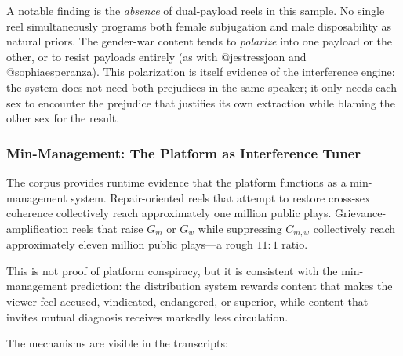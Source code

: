 \documentclass[12pt]{article}
\begin{document}
A notable finding is the \textit{absence} of dual-payload reels in this sample. No single reel simultaneously programs both female subjugation and male disposability as natural priors. The gender-war content tends to \textit{polarize} into one payload or the other, or to resist payloads entirely (as with @jestressjoan and @sophiaesperanza). This polarization is itself evidence of the interference engine: the system does not need both prejudices in the same speaker; it only needs each sex to encounter the prejudice that justifies its own extraction while blaming the other sex for the result.

\subsubsection{Min-Management: The Platform as Interference Tuner}

The corpus provides runtime evidence that the platform functions as a min-management system. Repair-oriented reels that attempt to restore cross-sex coherence collectively reach approximately one million public plays. Grievance-amplification reels that raise $G_m$ or $G_w$ while suppressing $C_{m,w}$ collectively reach approximately eleven million public plays---a rough $11{:}1$ ratio.

This is not proof of platform conspiracy, but it is consistent with the min-management prediction: the distribution system rewards content that makes the viewer feel accused, vindicated, endangered, or superior, while content that invites mutual diagnosis receives markedly less circulation.

The mechanisms are visible in the transcripts:
\end{document}
